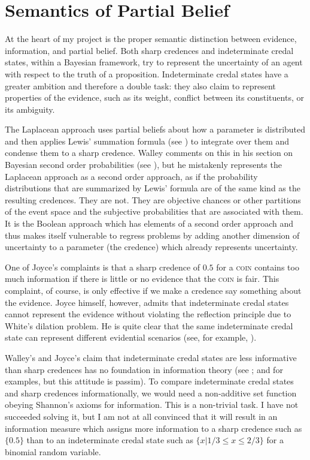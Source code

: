 \section{Semantics of Partial Belief}
\label{SemanticsOfPartialBelief}

At the heart of my project is the proper semantic
distinction between evidence, information, and partial
belief. Both sharp credences and indeterminate credal
states, within a Bayesian framework, try to represent
the uncertainty of an agent with respect to the truth
of a proposition. Indeterminate credal states have a
greater ambition and therefore a double task: they also
claim to represent properties of the evidence, such as
its weight, conflict between its constituents, or its
ambiguity.

The Laplacean approach uses partial beliefs about how a
parameter is distributed and then applies Lewis'
summation formula (see ) to
integrate over them and condense them to a sharp
credence. Walley comments on this  in
his section on Bayesian second order probabilities (see
), but he mistakenly
represents the Laplacean approach as a second order
approach, as if the probability distributions that are
summarized by Lewis' formula are of the same kind as
the resulting credences. They are not. They are
objective chances or other partitions of the event
space and the subjective probabilities that are
associated with them. It is the Boolean approach which
has elements of a second order approach and thus makes
itself vulnerable to regress problems by adding another
dimension of uncertainty to a parameter (the credence)
which already represents uncertainty.

One of Joyce's complaints is that a sharp credence of
$0.5$ for a \textsc{coin} contains too much information
if there is little or no evidence that the
\textsc{coin} is fair. This complaint, of course, is
only effective if we make a credence say something
about the evidence. Joyce himself, however, admits that
indeterminate credal states cannot represent the
evidence without violating the reflection principle due
to White's dilation problem. He is quite clear that the
same indeterminate credal state can represent different
evidential scenarios (see, for example,
).

Walley's and Joyce's claim that indeterminate credal
states are less informative than sharp credences has no
foundation in information theory (see
; and 
for examples, but this attitude is passim). To compare
indeterminate credal states and sharp credences
informationally, we would need a non-additive set
function obeying Shannon's axioms for information. This
is a non-trivial task. I have not succeeded solving it,
but I am not at all convinced that it will result in an
information measure which assigns more information to a
sharp credence such as $\{0.5\}$ than to an
indeterminate credal state such as
$\{x|1/3\leq{}x\leq{}2/3\}$ for a binomial random
variable.

